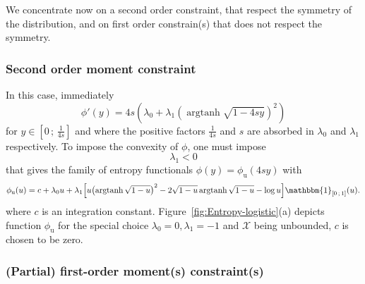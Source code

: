 \documentclass[entropy,article,submit,moreauthors,pdftex]{Definitions/mdpi}
\def\X{\mathcal{X}}
\def\un{\mathbbm{1}}
\def\argtanh{\operatorname{argtanh}}
\begin{document}
We concentrate  now on a second  order constraint, that respect  the symmetry of
the distribution,  and on  first order  constrain(s) that  does not  respect the
symmetry.



\subsubsection{Second order moment constraint}

In this case, immediately 
%
\[
\phi'(y)  =  4  s  \left(  \lambda_0  +  \lambda_1  \left(  \argtanh\sqrt{1-4sy}
\right)^2 \right)
\]
%
for $y \in \left[ 0 \, ; \, \frac{1}{4s} \right]$ and where the positive factors
$\frac{1}{4  s}$   and  $s$   are  absorbed   in  $\lambda_0$   and  $\lambda_1$
respectively.  To impose the convexity of $\phi$, one must impose
%
\[
\lambda_1 < 0
\]
%
that gives  the family of  entropy functionals $\phi(y) =  \phi_{\mathrm{u}}(4 s
y)$ with
%
\[
\phi_{\mathrm{u}}(u)  =   c  +   \lambda_0  u  +   \lambda_1  \left[   u  \left(
  \argtanh\sqrt{1-u}  \right)^2  -  2  \sqrt{1-u} \argtanh\sqrt{1-u}  -  \log  u
  \right] \un_{\left[ 0 \, ; \, 1 \right]}(u).
\]
%
where  $c$  is  an integration  constant.   Figure~\ref{fig:Entropy-logistic}(a)
depicts  function $\phi_{\mathrm{u}}$  for the  special choice  $\lambda_0 =  0,
\lambda_1 = -1$ and $\X$ being unbounded, $c$ is chosen to be zero.



\subsubsection{(Partial) first-order moment(s) constraint(s)}
\end{document}
